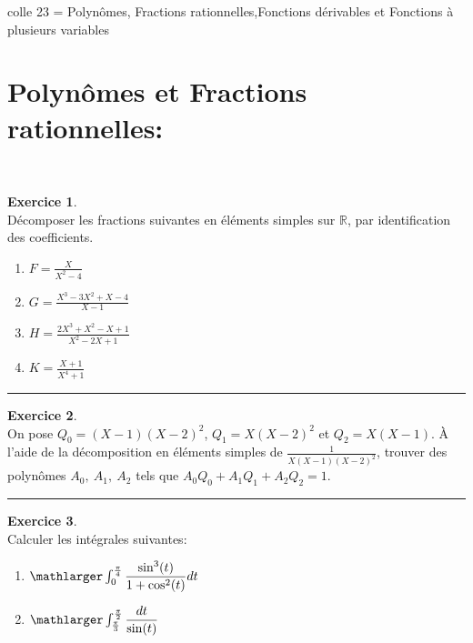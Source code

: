 \documentclass[a4paper,10pt]{article}
\theoremstyle{definition}
\theoremstyle{definition}
\newtheorem{exo}{Exercice}
\newcommand{\R}{\mathbb{R}}
\begin{document}
 	
	
	\begin{center}
		\Large \sc colle 23 = Polynômes, Fractions rationnelles,Fonctions dérivables et Fonctions à plusieurs variables
	\end{center}




\section*{Polynômes et Fractions rationnelles:}\hfill\\%
\begin{minipage}{1\linewidth}
	\begin{minipage}[t]{0.48\linewidth}
		\raggedright
		
			\begin{exo}\quad\\
			Décomposer les fractions suivantes en éléments simples sur $\R$, 
			par identification des coefficients.
			\begin{multicols}{2}
				\begin{enumerate}
					\item $F=\frac{X}{X^2-4}$
					\item $G=\frac{X^3-3X^2+X-4}{X-1}$
					\item $H=\frac{2X^3+X^2-X+1}{X^2-2X+1}$
					\item $K=\frac{X+1}{X^4+1}$
				\end{enumerate}
			\end{multicols}
			
			
			\centering
			\rule{1\linewidth}{0.6pt}
		\end{exo}
	
	\begin{exo}\quad\\
		
		On pose $Q_0=(X-1)(X-2)^2$, $Q_1=X(X-2)^2$ et $Q_2=X(X-1)$. 
		\`A l'aide de la décomposition en éléments simples de $\frac{1}{X(X-1)(X-2)^2}$, 
		trouver des polynômes $A_0,\ A_1,\ A_2$ tels que $A_0Q_0+A_1Q_1+A_2Q_2=1$.
		
		\centering
		\rule{1\linewidth}{0.6pt}
	\end{exo}


			

\begin{exo}\quad\\
	Calculer les intégrales suivantes: %
	\begin{multicols}{2}
		\begin{enumerate}
			\item $\mathlarger\int_{0}^{\frac{\pi}{4}}\dfrac{\sin^3(t)}{1+ \cos^2(t)}dt$
			\item $\mathlarger\int_{\frac{\pi}{3}}^{\frac{\pi}{2}}\dfrac{dt}{\sin(t)}$
		\end{enumerate}
	\end{multicols}
	

\end{exo}
\end{minipage}
\end{minipage}
\end{document}
